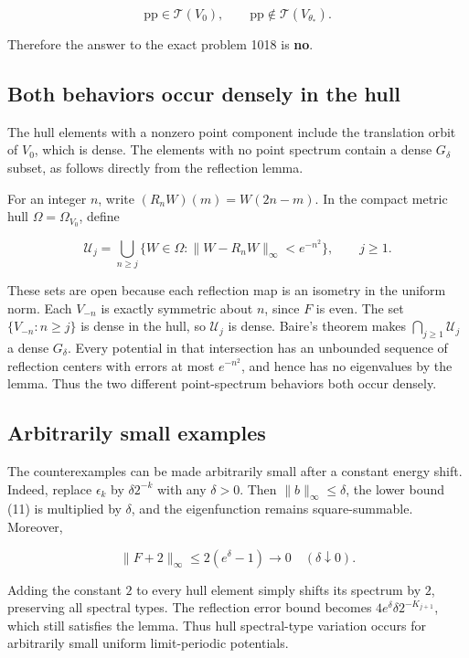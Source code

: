 \documentclass[11pt,a4paper]{article}
\begin{document}
\[
\mathrm{pp}\in\mathcal T(V_0),\qquad
\mathrm{pp}\notin\mathcal T(V_{\theta_*}).
\]

Therefore the answer to the exact problem 1018 is \textbf{no}.

\hypertarget{1018-both-behaviors-occur-densely-in-the-hull}{%
\subsection{Both behaviors occur densely in the
hull}\label{1018-both-behaviors-occur-densely-in-the-hull}}

The hull elements with a nonzero point component include the translation
orbit of \(V_0\), which is dense. The elements with no point spectrum
contain a dense \(G_\delta\) subset, as follows directly from the
reflection lemma.

For an integer \(n\), write \((R_nW)(m)=W(2n-m)\). In the compact metric
hull \(\Omega=\Omega_{V_0}\), define

\[
\mathcal U_j=\bigcup_{n\geq j}
\{W\in\Omega:\|W-R_nW\|_\infty<e^{-n^2}\},\qquad j\geq1.
\]

These sets are open because each reflection map is an isometry in the
uniform norm. Each \(V_{-n}\) is exactly symmetric about \(n\), since
\(F\) is even. The set \(\{V_{-n}:n\geq j\}\) is dense in the hull, so
\(\mathcal U_j\) is dense. Baire's theorem makes
\(\bigcap_{j\geq1}\mathcal U_j\) a dense \(G_\delta\). Every potential
in that intersection has an unbounded sequence of reflection centers
with errors at most \(e^{-n^2}\), and hence has no eigenvalues by the
lemma. Thus the two different point-spectrum behaviors both occur
densely.

\hypertarget{1018-arbitrarily-small-examples}{%
\subsection{Arbitrarily small
examples}\label{1018-arbitrarily-small-examples}}

The counterexamples can be made arbitrarily small after a constant
energy shift. Indeed, replace \(\epsilon_k\) by \(\delta2^{-k}\) with
any \(\delta>0\). Then \(\|b\|_\infty\leq\delta\), the lower bound (11)
is multiplied by \(\delta\), and the eigenfunction remains
square-summable. Moreover,

\[
\|F+2\|_\infty\leq2(e^\delta-1)\longrightarrow0
\quad(\delta\downarrow0).
\]

Adding the constant \(2\) to every hull element simply shifts its
spectrum by \(2\), preserving all spectral types. The reflection error
bound becomes \(4e^\delta\delta2^{-K_{j+1}}\), which still satisfies the
lemma. Thus hull spectral-type variation occurs for arbitrarily small
uniform limit-periodic potentials.
\end{document}
